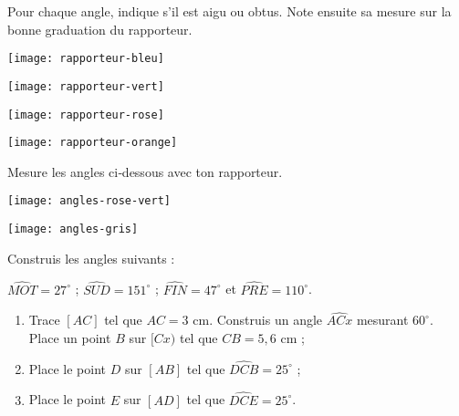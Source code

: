 \begin{exercice}
Pour chaque angle, indique s'il est aigu ou obtus. Note ensuite sa mesure sur la bonne graduation du rapporteur.
\begin{colenumerate}{2}
 \item  
 
 \texttt{[image: rapporteur-bleu]}
 \item 
 
 \texttt{[image: rapporteur-vert]}
 \item 

 \texttt{[image: rapporteur-rose]}
 \item 
 
 \texttt{[image: rapporteur-orange]}
 
 \end{colenumerate}
\end{exercice} 

\begin{exercice}
Mesure les angles ci‑dessous avec ton rapporteur.
 \begin{center} \texttt{[image: angles-rose-vert]} \end{center}
 
 \begin{center} \texttt{[image: angles-gris]} \end{center}
\end{exercice} 




\newpage





\begin{exercice}
Construis les angles suivants :

$\widehat{MOT} = 27^\circ$ ; $\widehat{SUD} = 151^\circ$ ; $\widehat{FIN} = 47^\circ$ et $\widehat{PRE} = 110^\circ$.
\end{exercice} 


\begin{exercice}
\begin{enumerate}
\item Trace $[AC]$ tel que $AC = 3$ cm. Construis un angle $\widehat{ACx}$ mesurant $60^\circ$. Place un point $B$ sur $[Cx)$ tel que $CB = 5,6$ cm ;
\item Place le point $D$ sur $[AB]$ tel que $\widehat{DCB} = 25^\circ$ ;
\item Place le point $E$ sur $[AD]$ tel que $\widehat{DCE} = 25^\circ$.
\end{enumerate}
\end{exercice} 


